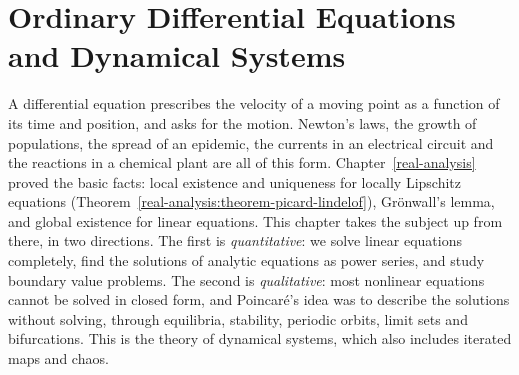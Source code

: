\chapter{Ordinary Differential Equations and Dynamical Systems}\label{ordinary-differential-equations}

A differential equation prescribes the velocity of a moving point as a function of its time and position, and asks for the motion. Newton's laws, the growth of populations, the spread of an epidemic, the
currents in an electrical circuit and the reactions in a chemical plant are all of this form. Chapter~\ref{real-analysis} proved the basic facts: local existence and uniqueness for locally Lipschitz equations
(Theorem~\ref{real-analysis:theorem-picard-lindelof}), Gr\"onwall's lemma, and global existence for linear equations. This chapter takes the subject up from there, in two directions. The first is \emph{quantitative}: we
solve linear equations completely, find the solutions of analytic equations as power series, and study boundary value problems. The second is \emph{qualitative}: most nonlinear equations cannot be solved in closed form,
and Poincar\'e's idea was to describe the solutions without solving, through equilibria, stability, periodic orbits, limit sets and bifurcations. This is the theory of dynamical systems, which also includes iterated
maps and chaos.
